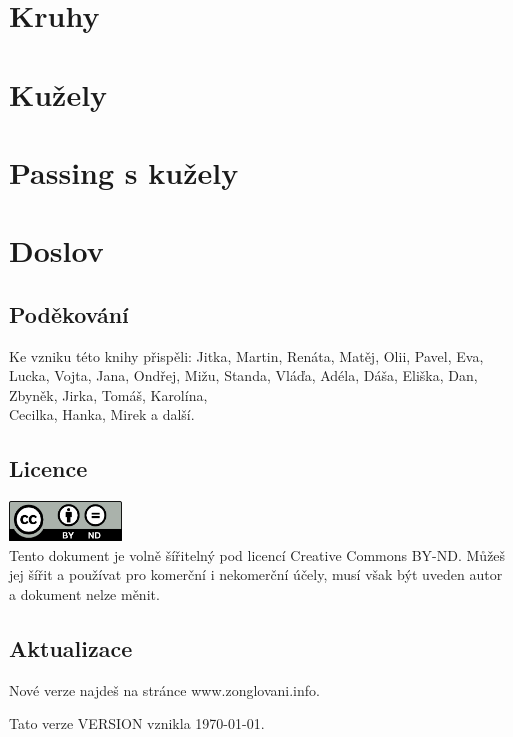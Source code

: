 \documentclass[12pt,a4paper,twoside]{book}
\begin{document}


\chapter{Kruhy}



\chapter{Kužely}



\chapter{Passing s kužely}



\chapter{Doslov}
\section{Poděkování}
Ke vzniku této knihy přispěli: Jitka, Martin, Renáta, Matěj, Olii, Pavel, Eva, Lucka, Vojta, Jana, Ondřej, Mižu, Standa, Vláďa, Adéla, Dáša, Eliška, Dan, Zbyněk, Jirka, Tomáš, Karolína,\\Cecilka, Hanka, Mirek a další.
\section{Licence}
\includegraphics[width=3cm]{obrazky/cc-by-nd.png}\\
Tento dokument je volně šířitelný pod licencí Creative Commons BY-ND.
Můžeš jej šířit a používat pro komerční i nekomerční účely, musí však být uveden autor a dokument nelze měnit.
\section{Aktualizace}
Nové verze najdeš na stránce www.zonglovani.info.

Tato verze VERSION vznikla \today.
\end{document}

